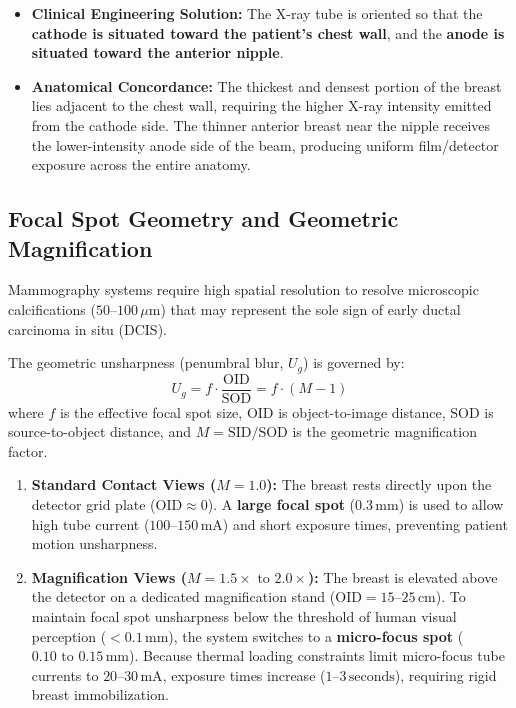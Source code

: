 \documentclass[11pt,a4paper]{article}
\begin{document}
\begin{itemize}[leftmargin=*]
    \item \textbf{Clinical Engineering Solution:} The X-ray tube is oriented so that the \textbf{cathode is situated toward the patient's chest wall}, and the \textbf{anode is situated toward the anterior nipple}.
    \item \textbf{Anatomical Concordance:} The thickest and densest portion of the breast lies adjacent to the chest wall, requiring the higher X-ray intensity emitted from the cathode side. The thinner anterior breast near the nipple receives the lower-intensity anode side of the beam, producing uniform film/detector exposure across the entire anatomy.
\end{itemize}

\subsection{Focal Spot Geometry and Geometric Magnification}

Mammography systems require high spatial resolution to resolve microscopic calcifications ($50\text{--}100\,\mu\text{m}$) that may represent the sole sign of early ductal carcinoma in situ (DCIS).

The geometric unsharpness (penumbral blur, $U_g$) is governed by:
\begin{equation}
    U_g = f \cdot \frac{\text{OID}}{\text{SOD}} = f \cdot (M - 1)
\end{equation}
where $f$ is the effective focal spot size, $\text{OID}$ is object-to-image distance, $\text{SOD}$ is source-to-object distance, and $M = \text{SID} / \text{SOD}$ is the geometric magnification factor.

\begin{enumerate}[leftmargin=*]
    \item \textbf{Standard Contact Views ($M = 1.0$):} The breast rests directly upon the detector grid plate ($\text{OID} \approx 0$). A \textbf{large focal spot} ($0.3\,\text{mm}$) is used to allow high tube current ($100\text{--}150\,\text{mA}$) and short exposure times, preventing patient motion unsharpness.
    \item \textbf{Magnification Views ($M = 1.5\times\text{ to }2.0\times$):} The breast is elevated above the detector on a dedicated magnification stand ($\text{OID} = 15\text{--}25\,\text{cm}$). To maintain focal spot unsharpness below the threshold of human visual perception ($< 0.1\,\text{mm}$), the system switches to a \textbf{micro-focus spot} ($0.10\text{ to }0.15\,\text{mm}$). Because thermal loading constraints limit micro-focus tube currents to $20\text{--}30\,\text{mA}$, exposure times increase ($1\text{--}3\,\text{seconds}$), requiring rigid breast immobilization.
\end{enumerate}
\end{document}
